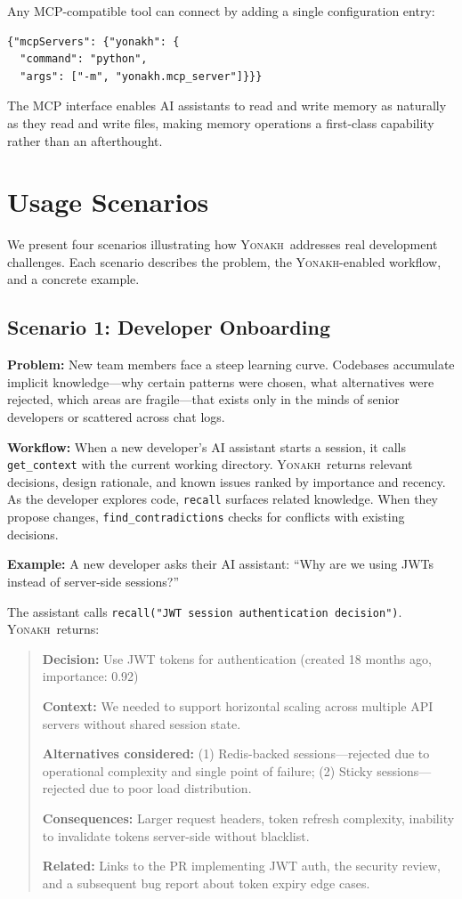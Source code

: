 \documentclass[10pt,journal,compsoc]{IEEEtran}
\newcommand{\yonakh}{\textsc{Yonakh}}
\begin{document}
Any MCP-compatible tool can connect by adding a single configuration entry:

\begin{verbatim}
{"mcpServers": {"yonakh": {
  "command": "python",
  "args": ["-m", "yonakh.mcp_server"]}}}
\end{verbatim}

The MCP interface enables AI assistants to read and write memory as naturally as they read and write files, making memory operations a first-class capability rather than an afterthought.

\section{Usage Scenarios}

We present four scenarios illustrating how \yonakh\ addresses real development challenges. Each scenario describes the problem, the \yonakh-enabled workflow, and a concrete example.

\subsection{Scenario 1: Developer Onboarding}

\textbf{Problem:} New team members face a steep learning curve. Codebases accumulate implicit knowledge---why certain patterns were chosen, what alternatives were rejected, which areas are fragile---that exists only in the minds of senior developers or scattered across chat logs.

\textbf{Workflow:} When a new developer's AI assistant starts a session, it calls \texttt{get\_context} with the current working directory. \yonakh\ returns relevant decisions, design rationale, and known issues ranked by importance and recency. As the developer explores code, \texttt{recall} surfaces related knowledge. When they propose changes, \texttt{find\_contradictions} checks for conflicts with existing decisions.

\textbf{Example:} A new developer asks their AI assistant: ``Why are we using JWTs instead of server-side sessions?''

The assistant calls \texttt{recall("JWT session authentication decision")}. \yonakh\ returns:

\begin{quote}
\textbf{Decision:} Use JWT tokens for authentication (created 18 months ago, importance: 0.92)

\textbf{Context:} We needed to support horizontal scaling across multiple API servers without shared session state.

\textbf{Alternatives considered:} (1) Redis-backed sessions---rejected due to operational complexity and single point of failure; (2) Sticky sessions---rejected due to poor load distribution.

\textbf{Consequences:} Larger request headers, token refresh complexity, inability to invalidate tokens server-side without blacklist.

\textbf{Related:} Links to the PR implementing JWT auth, the security review, and a subsequent bug report about token expiry edge cases.
\end{quote}
\end{document}
